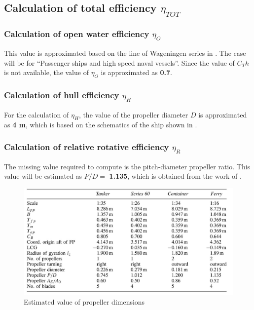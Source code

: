 \subsection{Calculation of total efficiency $\eta_{TOT}$}\label{sec:eta_tot_method}

\subsubsection*{Calculation of open water efficiency $\eta_O$}

This value is approximated based on the line of Wageningen series in  . The case will be for ``Passenger ships and high speed naval vessels''. Since the value of $C_Th$ is not available, the value of $\eta_O$ is approximated as \textbf{0.7}.

\subsubsection*{Calculation of hull efficiency $\eta_H$}

For the calculation of $\eta_H$, the value of the propeller diameter $D$ is approximated as \textbf{4 m}, which is based on the schematics of the ship shown in .

\subsubsection*{Calculation of relative rotative efficiency $\eta_R$}

The missing value required to compute  is the pitch-diameter propeller ratio. This value will be estimated as $P/D =$ \textbf{1.135}, which is obtained from the work of .

\begin{figure}[h]
    \centering
        \includegraphics[width=.95\textwidth]{02_figures/betram_wolff_ratiomodel .jpg}
        \caption{Estimated value of propeller dimensions }
        \label{fig:betram_wolff_propellerdimensions}
\end{figure}


